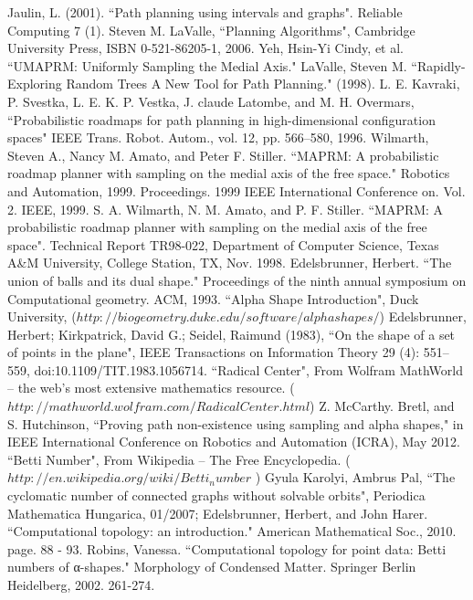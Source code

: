 \documentclass[11pt]{article}
\begin{document}
\begin{thebibliography}{1}
   Jaulin, L. (2001). ``Path planning using intervals and graphs". Reliable Computing 7 (1).  
   Steven M. LaValle, ``Planning Algorithms", Cambridge University Press, ISBN 0-521-86205-1, 2006.
   Yeh, Hsin-Yi Cindy, et al. ``UMAPRM: Uniformly Sampling the Medial Axis."
   LaValle, Steven M. ``Rapidly-Exploring Random Trees A New Tool for Path Planning." (1998).
   L. E. Kavraki, P. Svestka, L. E. K. P. Vestka, J. claude Latombe, and M. H. Overmars, ``Probabilistic roadmaps for path planning in high-dimensional configuration spaces" IEEE Trans. Robot. Autom., vol. 12, pp. 566–580, 1996.
   Wilmarth, Steven A., Nancy M. Amato, and Peter F. Stiller. ``MAPRM: A probabilistic roadmap planner with sampling on the medial axis of the free space." Robotics and Automation, 1999. Proceedings. 1999 IEEE International Conference on. Vol. 2. IEEE, 1999.
   S. A. Wilmarth, N. M. Amato, and P. F. Stiller. ``MAPRM: A probabilistic roadmap planner with sampling on the medial axis of the free space". Technical Report TR98-022, Department of Computer Science, Texas A\&M University, College Station, TX, Nov. 1998.
   Edelsbrunner, Herbert. ``The union of balls and its dual shape." Proceedings of the ninth annual symposium on Computational geometry. ACM, 1993.
   ``Alpha Shape Introduction", Duck University, ($http://biogeometry.duke.edu/software/alphashapes/$)
   Edelsbrunner, Herbert; Kirkpatrick, David G.; Seidel, Raimund (1983), ``On the shape of a set of points in the plane", IEEE Transactions on Information Theory 29 (4): 551–559, doi:10.1109/TIT.1983.1056714.
   ``Radical Center", From Wolfram MathWorld -- the web's most extensive mathematics resource. ($http://mathworld.wolfram.com/RadicalCenter.html$)
   Z. McCarthy. Bretl, and S. Hutchinson, ``Proving path non-existence using sampling and alpha shapes," in IEEE International Conference on Robotics and Automation (ICRA), May 2012.
   ``Betti Number", From Wikipedia -- The Free Encyclopedia. ( $http://en.wikipedia.org/wiki/Betti_number$ )   
   Gyula Karolyi, Ambrus Pal, ``The cyclomatic number of connected graphs without solvable orbits", Periodica Mathematica Hungarica, 01/2007; 
  Edelsbrunner, Herbert, and John Harer. ``Computational topology: an introduction." American Mathematical Soc., 2010. page. 88 - 93.
   Robins, Vanessa. ``Computational topology for point data: Betti numbers of α-shapes." Morphology of Condensed Matter. Springer Berlin Heidelberg, 2002. 261-274.
\end{thebibliography}
\end{document}

